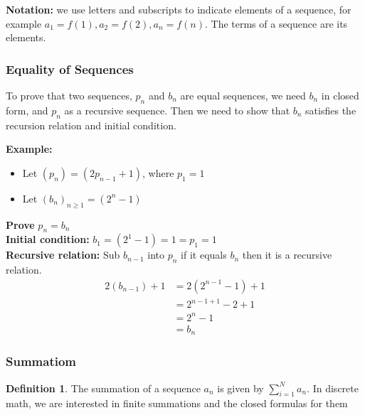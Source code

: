 \documentclass[12pt]{article}
\theoremstyle{definition}
\newtheorem{definition}{Definition}
\begin{document}
    \textbf{Notation:} we use letters and subscripts to indicate elements of a sequence,
    for example $a_1 = f(1), a_2 = f(2), a_n = f(n)$. The terms of a sequence are its elements.

    \subsubsection{Equality of Sequences}
    To prove that two sequences, $p_n$ and $b_n$ are equal sequences, we need
    $b_n$ in closed form, and $p_n$ as a recursive sequence. Then we need to show that
    $b_n$ satisfies the recursion relation and initial condition.

    \textbf{Example:}
    \begin{itemize}
        \item Let $(p_n)=(2p_{n-1}+1)$, where $p_1 = 1$
        \item Let $(b_n)_{n \ge 1}=(2^n-1)$
    \end{itemize}
  
    \textbf{Prove} $p_n = b_n$ \\
    \textbf{Initial condition:} $b_1=(2^1-1)=1=p_1=1$ \\
    \textbf{Recursive relation:} Sub $b_{n-1}$ into $p_n$ if it equals $b_n$
    then it is a recursive relation. 
    \begin{equation*}
        \begin{aligned}
            2(b_{n-1}) +1 &= 2(2^{n-1}-1)+1 \\
            &=2^{n-1+1}-2+1 \\
            &=2^n-1 \\
            &=b_n
        \end{aligned}
    \end{equation*}

    \subsubsection*{Summatiom}
    \begin{definition}
        \label{def:summation}
        The summation of a sequence $a_n$ is given by $\sum^{N}_{i=1}a_n$. In discrete math, we are 
        interested in finite summations and the closed formulas for them
    \end{definition}
\end{document}
